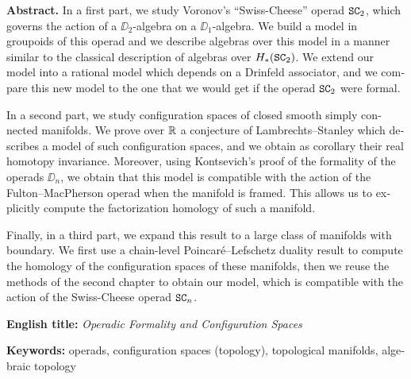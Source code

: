 \begin{english}
  \textbf{Abstract.}
  In a first part, we study Voronov's ``Swiss-Cheese'' operad $\mathtt{SC}_{2}$, which governs the action of a $\DD_{2}$-algebra on a $\DD_{1}$-algebra.
  We build a model in groupoids of this operad and we describe algebras over this model in a manner similar to the classical description of algebras over $H_{*}(\mathtt{SC}_{2})$.
  We extend our model into a rational model which depends on a Drinfeld associator, and we compare this new model to the one that we would get if the operad $\mathtt{SC}_{2}$ were formal.

  In a second part, we study configuration spaces of closed smooth simply connected manifolds.
  We prove over $\mathbb{R}$ a conjecture of Lambrechts--Stanley which describes a model of such configuration spaces, and we obtain as corollary their real homotopy invariance.
  Moreover, using Kontsevich's proof of the formality of the operads $\DD_{n}$, we obtain that this model is compatible with the action of the Fulton--MacPherson operad when the manifold is framed.
  This allows us to explicitly compute the factorization homology of such a manifold.

  Finally, in a third part, we expand this result to a large class of manifolds with boundary.
  We first use a chain-level Poincaré--Lefschetz duality result to compute the homology of the configuration spaces of these manifolds, then we reuse the methods of the second chapter to obtain our model, which is compatible with the action of the Swiss-Cheese operad $\mathtt{SC}_{n}$.

  \noindent \textbf{English title:} \emph{Operadic Formality and Configuration Spaces}

  \noindent \textbf{Keywords:} operads, configuration spaces (topology), topological manifolds, algebraic topology
\end{english}
\endgroup

